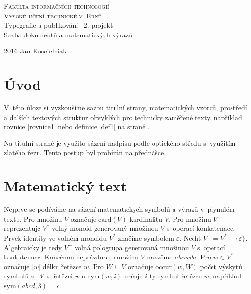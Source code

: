 \documentclass[11pt,a4paper,twocolumn]{article}
\theoremstyle{definition}
\theoremstyle{plain}
\theoremstyle{plain}
\begin{document}
\begin{titlepage}
\begin{center}
\Huge
\textsc{Fakulta informačních technologií\\
Vysoké učení technické v~Brně\\}
\LARGE
Typografie a publikování\,--\,2. projekt \\
Sazba dokumentů a matematických výrazů
\end{center} 
{\Large 2016 \hfill
Jan Koscielniak}
\end{titlepage}
\section*{Úvod}
 
V~této úloze si vyzkoušíme sazbu titulní strany, matematických vzorců, prostředí a dalších textových struktur obvyklých pro technicky zaměřené texty, například rovnice \eqref{rovnice1} nebo definice \ref{def1} na straně \pageref{def1}.

Na titulní straně je využito sázení nadpisu podle optického středu s~využitím zlatého řezu. Tento postup byl probírán na přednášce.

\section{Matematický text}
Nejprve se podíváme na sázení matematických symbolů a výrazů v~plynulém textu. Pro množinu $ V $ označuje $ \textrm{card}(V) $ kardinalitu $ V $.
Pro množinu $ V $ reprezentuje $ V^{*} $ volný monoid generovaný množinou $ V $ s~operací konkatenace.
Prvek identity ve volném monoidu $ V^{*} $ značíme symbolem $ \varepsilon $.
Nechť $ V^{+} = V^{*} - \lbrace\varepsilon\rbrace $. Algebraicky je tedy  $ V^{+} $ volná pologrupa generovaná množinou $ V $ s~operací konkatenace.
Konečnou neprázdnou množinu $ V $ nazvěme \textit{abeceda}.
Pro $ w \in V^{*} $ označuje $ \vert w\vert $ délku řetězce $ w $. Pro $ W \subseteq V $ označuje $ \textrm{occur}(w,W) $ počet výskytů symbolů z~$ W $ v~řetězci $ w $ a $ \textrm{sym}(w,i) $ určuje $ i $-tý symbol řetězce $ w $; například $ \textrm{sym}(abcd,3) = c $.
\end{document}
